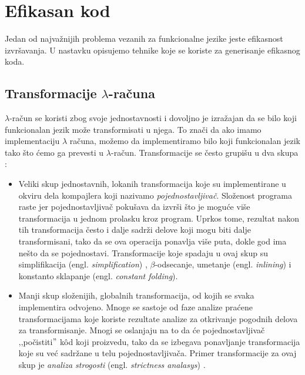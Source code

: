 \section{Efikasan kod}


Jedan od najvažnijih problema vezanih za funkcionalne jezike jeste efikasnost izvršavanja. 
U nastavku opisujemo tehnike koje se koriste za generisanje efikasnog koda.	


\subsection{Transformacije $\lambda$-računa}

$\lambda$-račun se koristi zbog svoje jednostavnosti i dovoljno je izražajan da se bilo koji funkcionalan jezik može transformisati u njega. To znači da ako imamo implementaciju $\lambda$ računa, možemo da implementiramo  bilo koji funkcionalan jezik tako što ćemo ga prevesti u $\lambda$-račun. Transformacije se često grupišu u dva skupa :


\begin{itemize}
	\item Veliki skup jednostavnih, lokanih transformacija koje su implementirane u okviru dela kompajlera koji nazivamo \textit{pojednostavljivač}. Složenost programa raste jer pojednostavljivač pokušava da izvrši što je moguće više transformacija u jednom prolasku kroz program. Uprkos tome, rezultat nakon tih transformacija često i dalje sadrži delove koji mogu biti dalje transformisani, tako da se ova operacija ponavlja više puta, dokle god ima nešto da se pojednostavi. Transformacije koje spadaju u ovaj skup su simplifikacija (engl. \textit{simplification}) \cite{compilation-by-program-transformation}, $\beta$-odsecanje, umetanje (engl. \textit{inlining}) i konstanto sklapanje (engl. \textit{constant folding}).
	
	\item Manji skup složenijih, globalnih transformacija, od kojih se svaka implementira odvojeno. Mnoge se sastoje od faze analize praćene transformacijama koje koriste rezultate analize za otkrivanje pogodnih delova za transformisanje. Mnogi se oslanjaju na to da će pojednostavljivač ‚‚počistiti$"$ k\^ od koji proizvedu, tako da se izbegava ponavljanje transformacija koje su već sadržane u telu pojednostavljivača. Primer transformacije za ovaj skup je  \textit{analiza strogosti} (engl. \textit{strictness analasys}) \cite{haskell-by-program-transformation}. 
	
\end{itemize}
  

